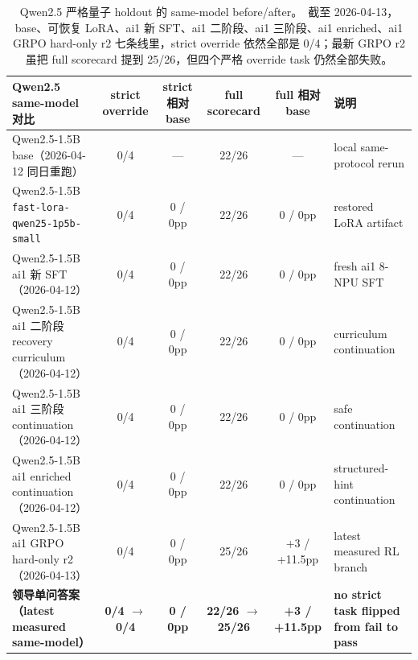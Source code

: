 \documentclass[11pt,a4paper]{article}
\newcommand{\code}[1]{\begingroup\ttfamily\footnotesize\nolinkurl{#1}\endgroup}
\begin{document}
\begin{table}[htbp]
\centering
\footnotesize
\begin{tabularx}{\textwidth}{p{3.2cm} c c c c Y}
\toprule
Qwen2.5 same-model 对比 & strict override & strict 相对 base & full scorecard & full 相对 base & 说明 \\
\midrule
Qwen2.5-1.5B base（2026-04-12 同日重跑） & 0/4 & --- & 22/26 & --- & local same-protocol rerun \\
Qwen2.5-1.5B \code{fast-lora-qwen25-1p5b-small} & 0/4 & 0 / 0pp & 22/26 & 0 / 0pp & restored LoRA artifact \\
Qwen2.5-1.5B ai1 新 SFT（2026-04-12） & 0/4 & 0 / 0pp & 22/26 & 0 / 0pp & fresh ai1 8-NPU SFT \\
Qwen2.5-1.5B ai1 二阶段 recovery curriculum（2026-04-12） & 0/4 & 0 / 0pp & 22/26 & 0 / 0pp & curriculum continuation \\
Qwen2.5-1.5B ai1 三阶段 continuation（2026-04-12） & 0/4 & 0 / 0pp & 22/26 & 0 / 0pp & safe continuation \\
Qwen2.5-1.5B ai1 enriched continuation（2026-04-12） & 0/4 & 0 / 0pp & 22/26 & 0 / 0pp & structured-hint continuation \\
Qwen2.5-1.5B ai1 GRPO hard-only r2（2026-04-13） & 0/4 & 0 / 0pp & 25/26 & +3 / +11.5pp & latest measured RL branch \\
\midrule
\textbf{领导单问答案（latest measured same-model）} & \textbf{0/4 $\rightarrow$ 0/4} & \textbf{0 / 0pp} & \textbf{22/26 $\rightarrow$ 25/26} & \textbf{+3 / +11.5pp} & \textbf{no strict task flipped from fail to pass} \\
\bottomrule
\end{tabularx}
\caption{Qwen2.5 严格量子 holdout 的 same-model before/after。\
截至 2026-04-13，base、可恢复 LoRA、ai1 新 SFT、ai1 二阶段、ai1 三阶段、ai1 enriched、ai1 GRPO hard-only r2 七条线里，strict override 依然全部是 0/4；最新 GRPO r2 虽把 full scorecard 提到 25/26，但四个严格 override task 仍然全部失败。}
\label{tab:qwen-same-model-compare}
\end{table}
\end{document}
